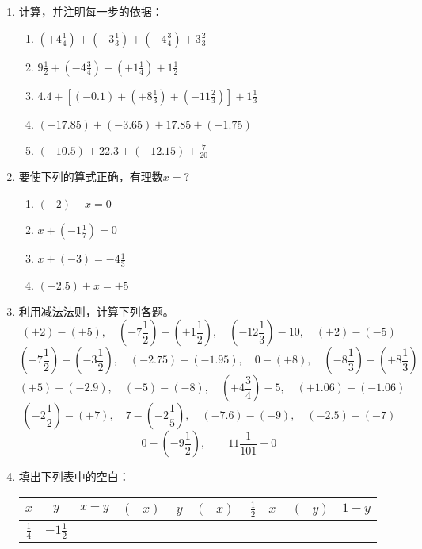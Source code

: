 \begin{enumerate}
\item 计算，并注明每一步的依据：
\begin{enumerate}
    \item $\left(+4 \frac{1}{4}\right)+\left(-3 \frac{1}{3}\right)+\left(-4 \frac{3}{4}\right)+3 \frac{2}{3}$
    \item $9 \frac{1}{2}+\left(-4 \frac{3}{4}\right)+\left(+1 \frac{1}{4}\right)+1 \frac{1}{2}$
    \item $4.4+\left[(-0.1)+\left(+8\frac{1}{3}\right)+\left(-11\frac{2}{3}\right)\right]+1\frac{1}{3}$
    \item $(-17.85)+(-3.65)+17.85+(-1.75)$
    \item $(-10.5)+22.3+(-12.15)+\frac{7}{20}$
\end{enumerate}
\item 要使下列的算式正确，有理数$x=?$
\begin{multicols}{2}
\begin{enumerate}
    \item $(-2)+x=0$
    \item $x+\left(-1\frac{1}{7}\right)=0$
    \item $x+(-3)=-4\frac{1}{3}$
    \item $(-2.5)+x=+5$
\end{enumerate}
\end{multicols}
\item 利用减法法则，计算下列各题。
\[(+2)-(+5),\quad \left(-7\frac{1}{2}\right)-\left(+1\frac{1}{2}\right),\quad \left(-12\frac{1}{3}\right)-10,\quad (+2)-(-5)\]
\[\left(-7\frac{1}{2}\right)-\left(-3\frac{1}{2}\right),\quad (-2.75)-(-1.95),\quad 0-(+8),\quad \left(-8\frac{1}{3}\right)-\left(+8\frac{1}{3}\right)\]
\[(+5)-(-2.9), \quad (-5)-(-8),\quad \left(+4\frac{3}{4}\right)-5,\quad (+1.06)-(-1.06)\]
\[\left(-2\frac{1}{2}\right)-(+7),\quad 7-\left(-2\frac{1}{5}\right),\quad (-7.6)-(-9),\quad (-2.5)-(-7)\]
\[0-\left(-9\frac{1}{2}\right),\qquad 11\frac{1}{101}-0\]

\item 填出下列表中的空白：
\begin{center}
\begin{tabular}{c|c|c|c|c|c|c}
\hline
$x$  &  $y$  &  $x-y$  &  $(-x)-y$  &  $(-x)-\frac{1}{2}$  &  $x-(-y)$  &  $1-y$\\
\hline
$\frac{1}{4}$ & $-1\frac{1}{2}$ &&&&&\\
\hline
\end{tabular}    
\end{center}


\end{enumerate}
